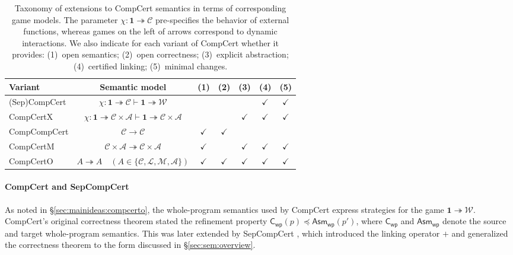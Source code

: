 \documentclass[acmsmall,authordraft]{acmart}
\newcommand{\kw}[1]{\ensuremath{ \mathsf{#1} }}
\newcommand{\refby}{\preceq}
\begin{document}
\begin{table} %
  \begin{tabular}{l@{\qquad}c@{\qquad}ccccc}
    \hline
    Variant & Semantic model & (1) & (2) & (3) & (4) & (5) \\
    \hline
    (Sep)CompCert \cite{compcert,sepcompcert} &
      $\chi : \mathbf{1} \twoheadrightarrow \mathcal{C}
       \vdash \mathbf{1} \twoheadrightarrow \mathcal{W}$ &
      & & & $\checkmark$ & $\checkmark$ \\
    CompCertX \cite{popl15} &
      $\chi : \mathbf{1} \twoheadrightarrow \mathcal{C} \times \mathcal{A}
       \vdash
       \mathbf{1} \twoheadrightarrow \mathcal{C} \times \mathcal{A}$
      & & & $\checkmark$ & $\checkmark$ & $\checkmark$ \\
    CompCompCert \cite{compcompcert} &
      $\mathcal{C} \rightarrow \mathcal{C}$ &
      $\checkmark$ & $\checkmark$ & & & \\
    CompCertM \cite{compcertm} &
      $\mathcal{C} \times \mathcal{A} \twoheadrightarrow
       \mathcal{C} \times \mathcal{A}$ &
      $\checkmark$ & & $\checkmark$ & $\checkmark$ & $\checkmark$ \\
    CompCertO &
      $A \twoheadrightarrow A \quad
      (A \in \{\mathcal{C}, \mathcal{L}, \mathcal{M}, \mathcal{A}\})$ &
      $\checkmark$&$\checkmark$&$\checkmark$&$\checkmark$&$\checkmark$ \\
    \hline
  \end{tabular}
  \caption{Taxonomy of extensions to CompCert semantics
    in terms of corresponding game models.
    The parameter $\chi : \mathbf{1} \twoheadrightarrow \mathcal{C}$
    pre-specifies the behavior of external functions,
    whereas games on the left of arrows
    correspond to dynamic interactions.
    We also indicate for each variant of CompCert whether it provides:
    (1)~open semantics;
    (2)~open correctness;
    (3)~explicit abstraction;
    (4)~certified linking;
    (5)~minimal changes.
  }
  \label{tbl:compcerts}
\end{table}

\paragraph{CompCert and SepCompCert} %

As noted in \S\ref{sec:mainideas:compcerto},
the whole-program semantics used by CompCert
express strategies for the game
$\mathbf{1} \twoheadrightarrow \mathcal{W}$.
CompCert's original correctness theorem
stated the refinement property
$\kw{C}_\kw{wp}(p) \refby \kw{Asm}_\kw{wp}(p')$,
where $\kw{C}_\kw{wp}$ and $\kw{Asm}_\kw{wp}$
denote the source and target whole-program semantics.
This was later extended by SepCompCert \cite{sepcompcert},
which introduced the linking operator $+$
and generalized the correctness theorem to
the form discussed in \S\ref{sec:sem:overview}.
\end{document}
